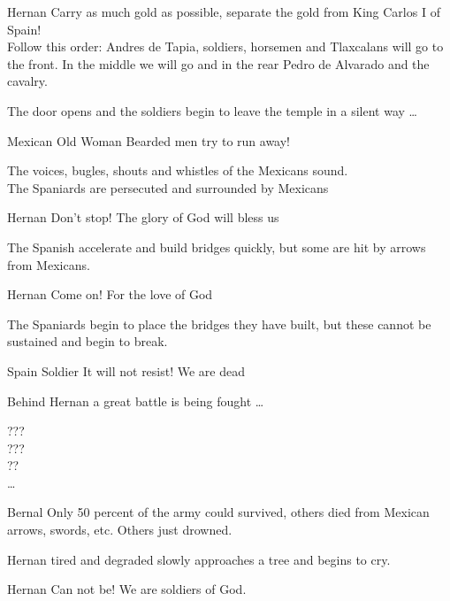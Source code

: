 \documentclass{screenplay}[2020/03/06]
\begin{document}

\begin{dialogue}{Hernan}
Carry as much gold as possible, separate the gold from King Carlos I of Spain!\\
Follow this order: Andres de Tapia, soldiers, horsemen and Tlaxcalans will go to the front. In the middle we will go and in the rear Pedro de Alvarado and the cavalry.
\end{dialogue}


The door opens and the soldiers begin to leave the temple in a silent way \dots


\begin{dialogue}[Screaming]{Mexican Old Woman}
Bearded men try to run away!
\end{dialogue}

The voices, bugles, shouts and whistles of the Mexicans sound. \\
The Spaniards are persecuted and surrounded by Mexicans

\begin{dialogue}[Screaming]{Hernan}
Don't stop! The glory of God will bless us
\end{dialogue}


The Spanish accelerate and build bridges quickly, but some are hit by arrows from Mexicans.

\begin{dialogue}{Hernan}
Come on! For the love of God
\end{dialogue}

The Spaniards begin to place the bridges they have built, but these cannot be sustained and begin to break.

\begin{dialogue}{Spain Soldier}
It will not resist! We are dead
\end{dialogue}

Behind Hernan a great battle is being fought \dots


???\\ ???\\ ??\\ \dots



\begin{dialogue}{Bernal}
Only 50 percent of the army could survived, others died from Mexican arrows, swords, etc. Others just drowned.
\end{dialogue}

Hernan tired and degraded slowly approaches a tree and begins to cry.

\begin{dialogue}[Crying]{Hernan}
Can not be! We are soldiers of God.
\end{dialogue}
\end{document}
